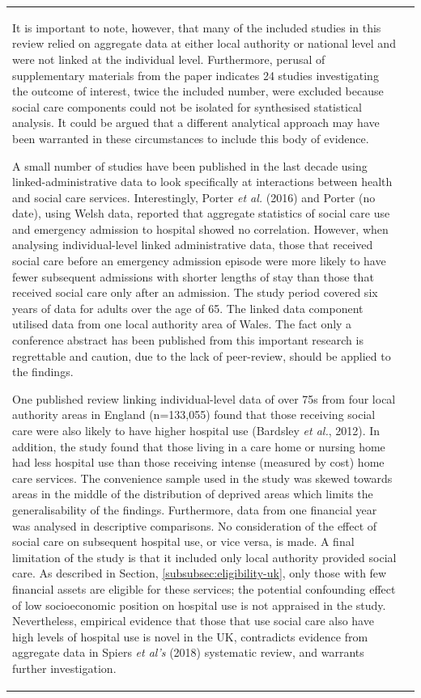 \documentclass[12pt,a4paper,oneside,table]{report}
\begin{document}
\begin{tabular}[t]{ll}
It is important to note, however, that many of the included studies in
this review relied on aggregate data at either local authority or
national level and were not linked at the individual level. Furthermore,
perusal of supplementary materials from the paper indicates 24 studies
investigating the outcome of interest, twice the included number, were
excluded because social care components could not be isolated for
synthesised statistical analysis. It could be argued that a different
analytical approach may have been warranted in these circumstances to
include this body of evidence.

A small number of studies have been published in the last decade using
linked-administrative data to look specifically at interactions between
health and social care services. Interestingly, Porter \textit{et al.}
(2016) and Porter (no date), using Welsh data, reported that aggregate
statistics of social care use and emergency admission to hospital showed
no correlation. However, when analysing individual-level linked
administrative data, those that received social care before an emergency
admission episode were more likely to have fewer subsequent admissions
with shorter lengths of stay than those that received social care only
after an admission. The study period covered six years of data for
adults over the age of 65. The linked data component utilised data from
one local authority area of Wales. The fact only a conference abstract
has been published from this important research is regrettable and
caution, due to the lack of peer-review, should be applied to the
findings.

One published review linking individual-level data of over 75s from four
local authority areas in England (n=133,055) found that those receiving
social care were also likely to have higher hospital use (Bardsley
\emph{et al.}, 2012). In addition, the study found that those living in
a care home or nursing home had less hospital use than those receiving
intense (measured by cost) home care services. The convenience sample
used in the study was skewed towards areas in the middle of the
distribution of deprived areas which limits the generalisability of the
findings. Furthermore, data from one financial year was analysed in
descriptive comparisons. No consideration of the effect of social care
on subsequent hospital use, or vice versa, is made. A final limitation
of the study is that it included only local authority provided social
care. As described in Section, \ref{subsubsec:eligibility-uk}, only
those with few financial assets are eligible for these services; the
potential confounding effect of low socioeconomic position on hospital
use is not appraised in the study. Nevertheless, empirical evidence that
those that use social care also have high levels of hospital use is
novel in the UK, contradicts evidence from aggregate data in Spiers
\emph{et al's} (2018) systematic review, and warrants further
investigation.


\end{tabular}
\end{document}
